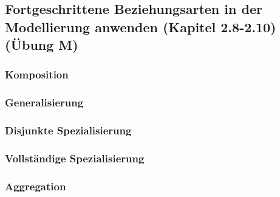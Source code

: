 \subsection{Fortgeschrittene Beziehungsarten in der Modellierung anwenden (Kapitel 2.8-2.10) (Übung M)}

\subsubsection{Komposition}
\subsubsection{Generalisierung}
\subsubsection{Disjunkte Spezialisierung}
\subsubsection{Vollständige Spezialisierung}
\subsubsection{Aggregation}